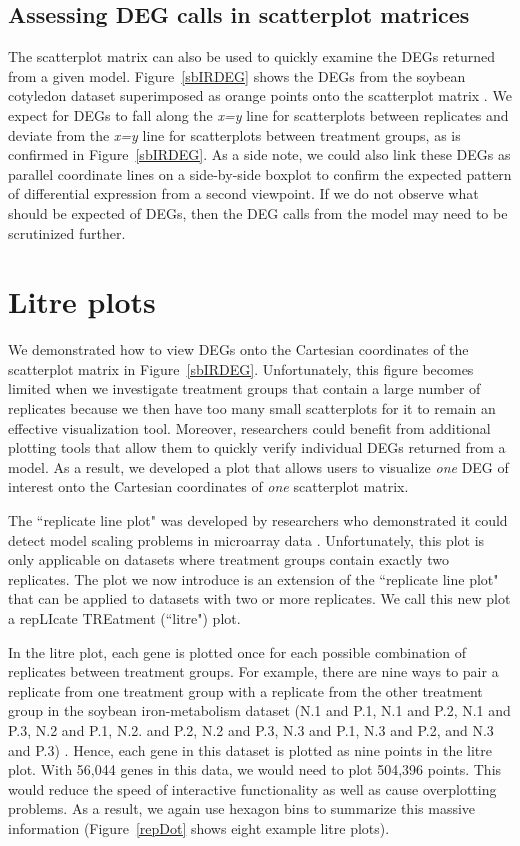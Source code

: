 \documentclass{bmcart}
\begin{document}
\begin{linenumbers}
\begin{doublespacing}
\subsection*{Assessing DEG calls in scatterplot matrices}

The scatterplot matrix can also be used to quickly examine the DEGs returned from a given model. Figure~\ref{sbIRDEG} shows the DEGs from the soybean cotyledon dataset superimposed as orange points onto the scatterplot matrix \cite{Brown}. We expect for DEGs to fall along the \textit{x=y} line for scatterplots between replicates and deviate from the \textit{x=y} line for scatterplots between treatment groups, as is confirmed in Figure~\ref{sbIRDEG}. As a side note, we could also link these DEGs as parallel coordinate lines on a side-by-side boxplot to confirm the expected pattern of differential expression from a second viewpoint. If we do not observe what should be expected of DEGs, then the DEG calls from the model may need to be scrutinized further.

\section*{Litre plots}

We demonstrated how to view DEGs onto the Cartesian coordinates of the scatterplot matrix in Figure~\ref{sbIRDEG}. Unfortunately, this figure becomes limited when we investigate treatment groups that contain a large number of replicates because we then have too many small scatterplots for it to remain an effective visualization tool. Moreover, researchers could benefit from additional plotting tools that allow them to quickly verify individual DEGs returned from a model. As a result, we developed a plot that allows users to visualize \textit{one} DEG of interest onto the Cartesian coordinates of \textit{one} scatterplot matrix.

The ``replicate line plot" was developed by researchers who demonstrated it could detect model scaling problems in microarray data \cite{Cook}. Unfortunately, this plot is only applicable on datasets where treatment groups contain exactly two replicates. The plot we now introduce is an extension of the ``replicate line plot" that can be applied to datasets with two or more replicates. We call this new plot a repLIcate TREatment (``litre") plot.

In the litre plot, each gene is plotted once for each possible combination of replicates between treatment groups. For example, there are nine ways to pair a replicate from one treatment group with a replicate from the other treatment group in the soybean iron-metabolism dataset (N.1 and P.1, N.1 and P.2, N.1 and P.3, N.2 and P.1, N.2. and P.2, N.2 and P.3, N.3 and P.1, N.3 and P.2, and N.3 and P.3) \cite{Lauter16}. Hence, each gene in this dataset is plotted as nine points in the litre plot. With 56,044 genes in this data, we would need to plot 504,396 points. This would reduce the speed of interactive functionality as well as cause overplotting problems. As a result, we again use hexagon bins to summarize this massive information (Figure~\ref{repDot} shows eight example litre plots).


\end{doublespacing}
\end{linenumbers}
\end{document}
